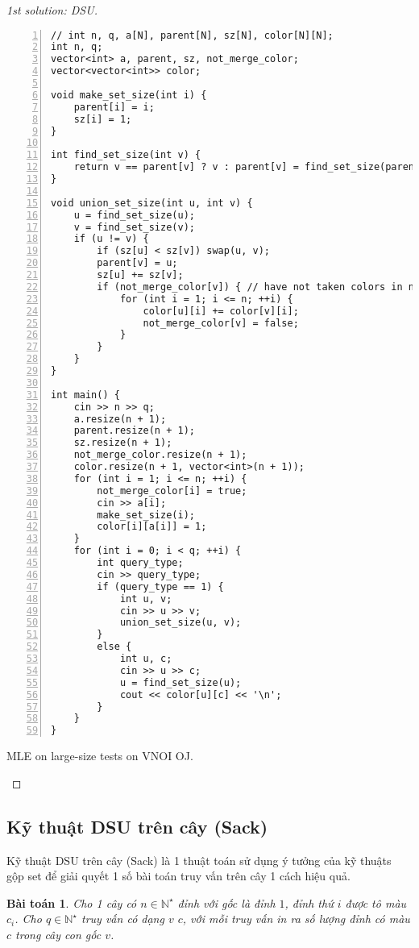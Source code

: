 \documentclass{article}
\newtheorem{baitoan}{Bài toán}
\begin{document}
\begin{proof}[1st solution: DSU]
\begin{enumerate}
\begin{Verbatim}[numbers=left,xleftmargin=5mm]
// int n, q, a[N], parent[N], sz[N], color[N][N];
int n, q;
vector<int> a, parent, sz, not_merge_color;
vector<vector<int>> color;

void make_set_size(int i) {
    parent[i] = i;
    sz[i] = 1;
}

int find_set_size(int v) {
    return v == parent[v] ? v : parent[v] = find_set_size(parent[v]);
}

void union_set_size(int u, int v) {
    u = find_set_size(u);
    v = find_set_size(v);
    if (u != v) {
        if (sz[u] < sz[v]) swap(u, v);
        parent[v] = u;
        sz[u] += sz[v];
        if (not_merge_color[v]) { // have not taken colors in node v yet
            for (int i = 1; i <= n; ++i) {
                color[u][i] += color[v][i];
                not_merge_color[v] = false;
            }
        }
    }
}

int main() {
    cin >> n >> q;
    a.resize(n + 1);
    parent.resize(n + 1);
    sz.resize(n + 1);
    not_merge_color.resize(n + 1);
    color.resize(n + 1, vector<int>(n + 1));
    for (int i = 1; i <= n; ++i) {
        not_merge_color[i] = true;
        cin >> a[i];
        make_set_size(i);
        color[i][a[i]] = 1;
    }
    for (int i = 0; i < q; ++i) {
        int query_type;
        cin >> query_type;
        if (query_type == 1) {
            int u, v;
            cin >> u >> v;
            union_set_size(u, v);
        }
        else {
            int u, c;
            cin >> u >> c;
            u = find_set_size(u);
            cout << color[u][c] << '\n';
        }
    }
}
        \end{Verbatim}
        MLE on large-size tests on VNOI OJ.
    \end{enumerate}
\end{proof}


\subsection{Kỹ thuật DSU trên cây (Sack)}
Kỹ thuật DSU trên cây (Sack) là 1 thuật toán sử dụng ý tưởng của kỹ thuậts gộp set để  giải quyết 1 số bài toán truy vấn trên cây 1 cách hiệu quả.

\begin{baitoan}
    Cho 1 cây có $n\in\mathbb{N}^\star$ đỉnh với gốc là đỉnh $1$, đỉnh thứ $i$ được tô màu $c_i$. Cho $q\in\mathbb{N}^\star$ truy vấn có dạng $v$ $c$, với mỗi truy vấn in ra số lượng đỉnh có màu $c$ trong cây con gốc $v$.
\end{baitoan}
\end{document}
